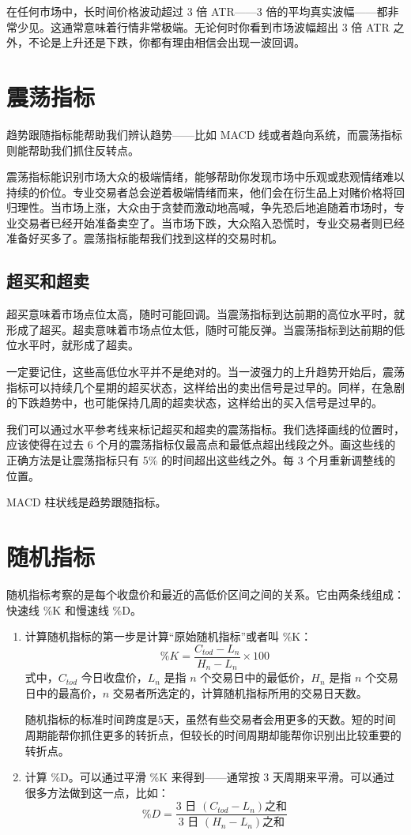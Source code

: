 在任何市场中，长时间价格波动超过 3 倍 ATR——3 倍的平均真实波幅——都非常少见。这通常意味着行情非常极端。无论何时你看到市场波幅超出 3 倍 ATR 之外，不论是上升还是下跌，你都有理由相信会出现一波回调。
\section{震荡指标}
趋势跟随指标能帮助我们辨认趋势——比如 MACD 线或者趋向系统，而震荡指标则能帮助我们抓住反转点。

震荡指标能识别市场大众的极端情绪，能够帮助你发现市场中乐观或悲观情绪难以持续的价位。专业交易者总会逆着极端情绪而来，他们会在衍生品上对赌价格将回归理性。当市场上涨，大众由于贪婪而激动地高喊，争先恐后地追随着市场时，专业交易者已经开始准备卖空了。当市场下跌，大众陷入恐慌时，专业交易者则已经准备好买多了。震荡指标能帮我们找到这样的交易时机。
\subsection*{超买和超卖}
超买意味着市场点位太高，随时可能回调。当震荡指标到达前期的高位水平时，就形成了超买。超卖意味着市场点位太低，随时可能反弹。当震荡指标到达前期的低位水平时，就形成了超卖。

一定要记住，这些高低位水平并不是绝对的。当一波强力的上升趋势开始后，震荡指标可以持续几个星期的超买状态，这样给出的卖出信号是过早的。同样，在急剧的下跌趋势中，也可能保持几周的超卖状态，这样给出的买入信号是过早的。

\begin{tcolorbox}
    我们可以通过水平参考线来标记超买和超卖的震荡指标。我们选择画线的位置时，应该使得在过去 6 个月的震荡指标仅最高点和最低点超出线段之外。画这些线的正确方法是让震荡指标只有 5\% 的时间超出这些线之外。每 3 个月重新调整线的位置。
\end{tcolorbox}

MACD 柱状线是趋势跟随指标。
\section{随机指标}
随机指标考察的是每个收盘价和最近的高低价区间之间的关系。它由两条线组成：快速线 \%K 和慢速线 \%D。
\begin{enumerate}
    \item 计算随机指标的第一步是计算“原始随机指标”或者叫 \%K：
          $$\%K=\frac{C_{tod}-L_n}{H_n-L_n}\times 100$$
          式中，$C_{tod}$ 今日收盘价，$L_n$ 是指 $n$ 个交易日中的最低价，$H_n$ 是指 $n$ 个交易日中的最高价，$n$ 交易者所选定的，计算随机指标所用的交易日天数。

          随机指标的标准时间跨度是5天，虽然有些交易者会用更多的天数。短的时间周期能帮你抓住更多的转折点，但较长的时间周期却能帮你识别出比较重要的转折点。
    \item 计算 \%D。可以通过平滑 \%K 来得到——通常按 3 天周期来平滑。可以通过很多方法做到这一点，比如：
          $$\%D=\frac{\text{3 日 }(C_{tod}-L_n)\text{之和}}{\text{3 日 }(H_{n}-L_n)\text{之和}}$$
\end{enumerate}

